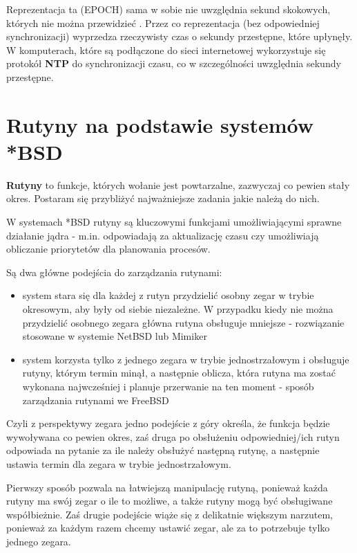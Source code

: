 \documentclass[shortabstract]{iithesis}
\theoremstyle{definition} \newtheorem*{definition}{Definicja}
\theoremstyle{definition} \newtheorem*{example}{Przykład}
\theoremstyle{definition} \newtheorem*{remark}{Uwaga}
\begin{document}
Reprezentacja ta (EPOCH) sama w sobie nie uwzględnia sekund skokowych, których nie można przewidzieć \cite{bib:leapsec}. Przez co reprezentacja (bez odpowiedniej synchronizacji) wyprzedza rzeczywisty czas o sekundy przestępne, które upłynęły. W komputerach, które są podłączone do sieci internetowej wykorzystuje się protokół \textbf{NTP} \cite{bib:unp} do synchronizacji czasu, co w szczególności uwzględnia sekundy przestępne.

\section{Rutyny na podstawie systemów *BSD}
\textbf{Rutyny} to funkcje, których wołanie jest powtarzalne, zazwyczaj co pewien stały okres. Postaram się przybliżyć najważniejsze zadania jakie należą do nich.

W systemach *BSD rutyny są kluczowymi funkcjami umożliwiającymi sprawne działanie jądra - m.in. odpowiadają za aktualizację czasu czy umożliwiają obliczanie priorytetów dla planowania procesów.

Są dwa główne podejścia do zarządzania rutynami:

\begin{itemize}
    \item system stara się dla każdej z rutyn przydzielić osobny zegar w trybie okresowym, aby były od siebie niezależne. W przypadku kiedy nie można przydzielić osobnego zegara główna rutyna obsługuje mniejsze - rozwiązanie stosowane w systemie NetBSD lub Mimiker
    \item system  korzysta tylko z jednego zegara w trybie jednostrzałowym i obsługuje rutyny, którym termin minął, a następnie oblicza, która rutyna ma zostać wykonana najwcześniej i planuje przerwanie na ten moment - sposób zarządzania rutynami we FreeBSD
\end{itemize}

Czyli z perspektywy zegara jedno podejście z góry określa, że funkcja będzie wywoływana co pewien okres, zaś druga po obsłużeniu odpowiedniej/ich rutyn odpowiada na pytanie za ile należy obsłużyć następną rutynę, a następnie ustawia termin dla zegara w trybie jednostrzałowym. 

Pierwszy sposób pozwala na łatwiejszą manipulację rutyną, ponieważ każda rutyny ma swój zegar o ile to możliwe, a także rutyny mogą być obsługiwane współbieżnie. Zaś drugie podejście wiąże się z delikatnie większym narzutem, ponieważ za każdym razem chcemy ustawić zegar, ale za to potrzebuje tylko jednego zegara.
\end{document}
